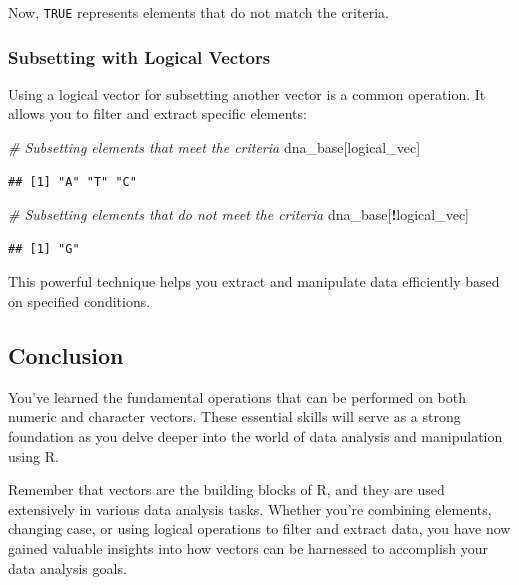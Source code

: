 \documentclass[
]{book}
\newenvironment{Shaded}{\begin{snugshade}}{\end{snugshade}}
\newcommand{\CommentTok}[1]{\textcolor[rgb]{0.56,0.35,0.01}{\textit{#1}}}
\newcommand{\NormalTok}[1]{#1}
\newcommand{\SpecialCharTok}[1]{\textcolor[rgb]{0.81,0.36,0.00}{\textbf{#1}}}
\begin{document}
Now, \texttt{TRUE} represents elements that do not match the criteria.

\hypertarget{subsetting-with-logical-vectors}{%
\subsubsection{Subsetting with Logical Vectors}\label{subsetting-with-logical-vectors}}

Using a logical vector for subsetting another vector is a common operation. It allows you to filter and extract specific elements:

\begin{Shaded}
\begin{Highlighting}[]
\CommentTok{\# Subsetting elements that meet the criteria}
\NormalTok{dna\_base[logical\_vec]}
\end{Highlighting}
\end{Shaded}

\begin{verbatim}
## [1] "A" "T" "C"
\end{verbatim}

\begin{Shaded}
\begin{Highlighting}[]
\CommentTok{\# Subsetting elements that do not meet the criteria}
\NormalTok{dna\_base[}\SpecialCharTok{!}\NormalTok{logical\_vec]}
\end{Highlighting}
\end{Shaded}

\begin{verbatim}
## [1] "G"
\end{verbatim}

This powerful technique helps you extract and manipulate data efficiently based on specified conditions.

\hypertarget{conclusion}{%
\subsection{Conclusion}\label{conclusion}}

You've learned the fundamental operations that can be performed on both numeric and character vectors. These essential skills will serve as a strong foundation as you delve deeper into the world of data analysis and manipulation using R.

Remember that vectors are the building blocks of R, and they are used extensively in various data analysis tasks. Whether you're combining elements, changing case, or using logical operations to filter and extract data, you have now gained valuable insights into how vectors can be harnessed to accomplish your data analysis goals.
\end{document}
